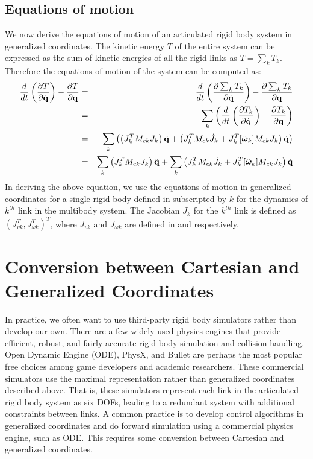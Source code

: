 \subsection{Equations of motion}
We now derive the equations of motion of an articulated rigid body system in generalized coordinates. The kinetic energy $T$ of the entire system can be expressed as the sum of kinetic energies of all the rigid links as $T=\sum_k T_k$. Therefore the equations of motion of the system can be computed as:
\begin{eqnarray}
\nonumber
\frac{d}{dt} \left ( \frac{\partial T}{\partial \dot{\mathbf{q}}} \right ) - \frac{\partial T}{\partial \mathbf{q}} & = & \frac{d}{dt} \left ( \frac{\partial \sum_k T_k}{\partial \dot{\mathbf{q}}} \right ) - \frac{\partial \sum_k T_k}{\partial \mathbf{q}}\\
\nonumber
& = & \sum_k \left ( \frac{d}{dt} \left ( \frac{\partial T_k}{\partial \dot{\mathbf{q}}} \right ) - \frac{\partial T_k}{\partial \mathbf{q}} \right )\\
\nonumber
& = & \sum_k \left ( \left( J_k^T M_{ck} J_k \right )\ddot{\mathbf{q}} + \left( J_k^T M_{ck} \dot{J}_k + J_k^T [\tilde{\bm{\omega}}_k]M_{ck} J_k \right )\dot{\mathbf{q}} \right )\\
& = &  \sum_k \left( J_k^T M_{ck} J_k \right )\ddot{\mathbf{q}} + \sum_k\left( J_k^T M_{ck} \dot{J}_k + J_k^T [\tilde{\bm{\omega}}_k]M_{ck} J_k \right )\dot{\mathbf{q}}
\end{eqnarray}
In deriving the above equation, we use the equations of motion in generalized coordinates for a single rigid body defined in  subscripted by $k$ for the dynamics of $k^{th}$ link in the multibody system. The Jacobian $J_k$ for the $k^{th}$ link is defined as $(J_{vk}^T,J_{\omega k}^T)^T$, where $J_{vk}$ and $J_{\omega k}$ are defined in  and  respectively. 



\section{Conversion between Cartesian and Generalized Coordinates}
In practice, we often want to use third-party rigid body simulators
rather than develop our own. There are a few widely used physics
engines that provide efficient, robust, and fairly accurate rigid body
simulation and collision handling. Open Dynamic Engine (ODE), PhysX, and
Bullet are perhaps the most popular free choices among game developers and
academic researchers. These commercial simulators use the maximal
representation rather than generalized coordinates
described above. That is, these simulators represent each link in the
articulated rigid body system as six DOFs,
leading to a redundant system with additional constraints between
links. A common practice is to develop control algorithms in
generalized coordinates and do forward simulation using a commercial
physics engine, such as ODE. This requires some conversion between
Cartesian and generalized coordinates.

